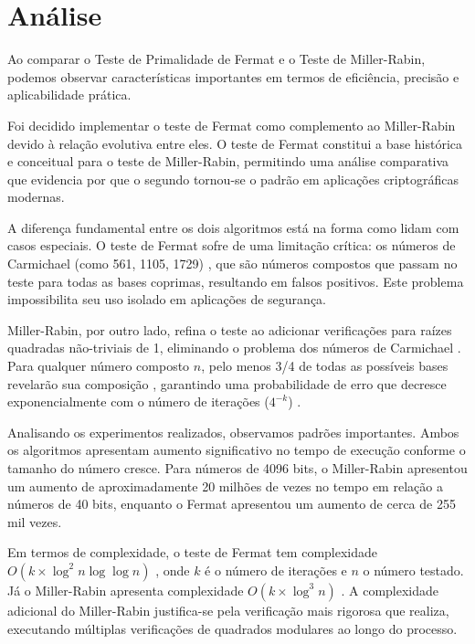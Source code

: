 \section{Análise}

Ao comparar o Teste de Primalidade de Fermat e o Teste de Miller-Rabin, podemos observar características importantes em termos de eficiência, precisão e aplicabilidade prática.

Foi decidido implementar o teste de Fermat como complemento ao Miller-Rabin devido à relação evolutiva entre eles. O teste de Fermat constitui a base histórica e conceitual para o teste de Miller-Rabin, permitindo uma análise comparativa que evidencia por que o segundo tornou-se o padrão em aplicações criptográficas modernas.

A diferença fundamental entre os dois algoritmos está na forma como lidam com casos especiais. O teste de Fermat sofre de uma limitação crítica: os números de Carmichael (como 561, 1105, 1729) \cite{alford1994infinitely, pinch1993carmichael}, que são números compostos que passam no teste para todas as bases coprimas, resultando em falsos positivos. Este problema impossibilita seu uso isolado em aplicações de segurança.

Miller-Rabin, por outro lado, refina o teste ao adicionar verificações para raízes quadradas não-triviais de 1, eliminando o problema dos números de Carmichael \cite{yan2009primality}. Para qualquer número composto $n$, pelo menos 3/4 de todas as possíveis bases revelarão sua composição \cite{crandall2005prime}, garantindo uma probabilidade de erro que decresce exponencialmente com o número de iterações ($4^{-k}$) \cite{rabin1980probabilistic}.

Analisando os experimentos realizados, observamos padrões importantes. Ambos os algoritmos apresentam aumento significativo no tempo de execução conforme o tamanho do número cresce. Para números de 4096 bits, o Miller-Rabin apresentou um aumento de aproximadamente 20 milhões de vezes no tempo em relação a números de 40 bits, enquanto o Fermat apresentou um aumento de cerca de 255 mil vezes.

Em termos de complexidade, o teste de Fermat tem complexidade $O(k \times \log^2 n \log \log n)$ \cite{cormen2009introduction}, onde $k$ é o número de iterações e $n$ o número testado. Já o Miller-Rabin apresenta complexidade $O(k \times \log^3 n)$ \cite{crandall2005prime}. A complexidade adicional do Miller-Rabin justifica-se pela verificação mais rigorosa que realiza, executando múltiplas verificações de quadrados modulares ao longo do processo.

